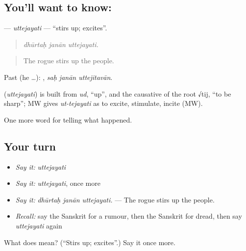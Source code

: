 \subsection*{You'll want to know: }
\textbf{} — \emph{uttejayati} — \textquotedblleft{}stirs up; excites\textquotedblright{}.

\begin{quote}
  
\end{quote}

\begin{quote}
\emph{dhūrtaḥ janān uttejayati.}
\end{quote}

\begin{quote}
The rogue stirs up the people.
\end{quote}

Past (he …):   , \emph{saḥ janān uttejitavān}.

\begin{cousinweb}
\textbf{} (\emph{uttejayati}) is built from \emph{ud}, \textquotedblleft{}up\textquotedblright{}, and the causative of the root √tij, \textquotedblleft{}to be sharp\textquotedblright{}; MW gives \emph{ut-tejayati} as to excite, stimulate, incite (MW).
\end{cousinweb}

\begin{grammarlens}[title={What you've built}]
One more word for telling what happened.
\end{grammarlens}

\subsection*{Your turn}
\begin{itemize}
\raggedright
  \item \emph{Say it:} \emph{uttejayati}
  \item \emph{Say it:} \emph{uttejayati}, once more
  \item \emph{Say it:} \emph{dhūrtaḥ janān uttejayati.} — The rogue stirs up the people.
  \item \emph{Recall:} say the Sanskrit for a rumour, then the Sanskrit for dread, then say \emph{uttejayati} again
\end{itemize}

\begin{tcolorbox}[breakable,colback=teal!4,colframe=teal!35!black,title={Before you move on}]
What does  mean? (\textquotedblleft{}Stirs up; excites\textquotedblright{}.) Say it once more.
\end{tcolorbox}

